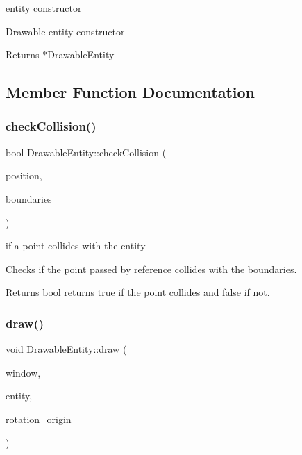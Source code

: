 entity constructor

Drawable entity constructor

\begin{DoxyReturn}{Returns}
$\ast$\+Drawable\+Entity 
\end{DoxyReturn}


\subsection{Member Function Documentation}
\mbox{\label{class_drawable_entity_aa8c71a16b70006246b445b546b71a5b3}} 
\subsubsection{\texorpdfstring{check\+Collision()}{checkCollision()}}
{\footnotesize\ttfamily bool Drawable\+Entity\+::check\+Collision (\begin{DoxyParamCaption}\item[{const sf\+::\+Vector2f \&}]{position,  }\item[{const sf\+::\+Float\+Rect \&}]{boundaries }\end{DoxyParamCaption})}

if a point collides with the entity

Checks if the point passed by reference collides with the boundaries.

\begin{DoxyReturn}{Returns}
bool returns true if the point collides and false if not. 
\end{DoxyReturn}
\mbox{\label{class_drawable_entity_a31ea3607cab83dc56103de086764369e}} 
\subsubsection{\texorpdfstring{draw()}{draw()}}
{\footnotesize\ttfamily void Drawable\+Entity\+::draw (\begin{DoxyParamCaption}\item[{sf\+::\+Render\+Window \&}]{window,  }\item[{const sf\+::\+Drawable \&}]{entity,  }\item[{const sf\+::\+Vector2f \&}]{rotation\+\_\+origin }\end{DoxyParamCaption})}



